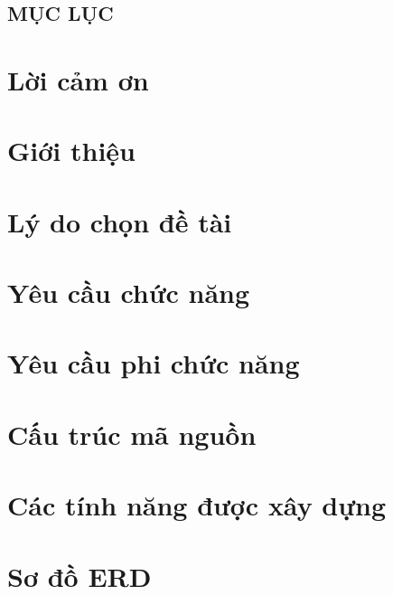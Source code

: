 \documentclass[a4paper,12pt]{report}
\begin{document}


\newpage

\section*{MỤC LỤC}
\tableofcontents %

\newpage

\chapter{Lời cảm ơn}\label{sec:thanks}


\chapter{Giới thiệu}\label{sec:introduction}


\chapter{Lý do chọn đề tài}\label{sec:reason}


\chapter{Yêu cầu chức năng}\label{sec:functional-requirements}


\chapter{Yêu cầu phi chức năng}\label{sec:non-functional-requirements}



\chapter{Cấu trúc mã nguồn}


\chapter{Các tính năng được xây dựng}


\chapter{Sơ đồ ERD}

\end{document}
